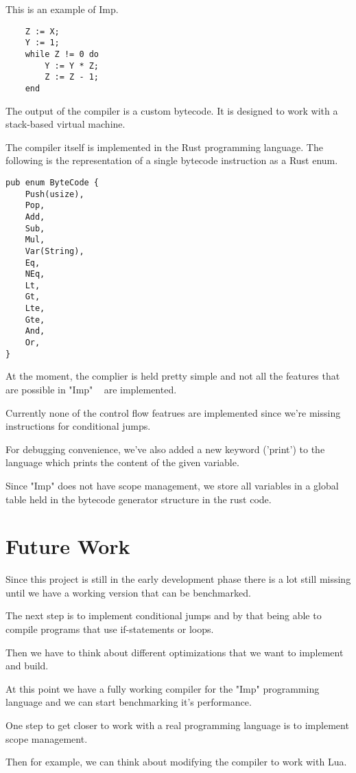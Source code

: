 \documentclass{article}
\begin{document}
This is an example of Imp.
\begin{verbatim}
    Z := X;
    Y := 1;
    while Z != 0 do
        Y := Y * Z;
        Z := Z - 1;
    end
\end{verbatim}

The output of the compiler is a custom bytecode. It is designed to work with a
stack-based virtual machine.

The compiler itself is implemented in the Rust programming language. The
following is the representation of a single bytecode instruction as a Rust
enum.

\begin{verbatim}
pub enum ByteCode {
    Push(usize),
    Pop,
    Add,
    Sub,
    Mul,
    Var(String),
    Eq,
    NEq,
    Lt,
    Gt,
    Lte,
    Gte,
    And,
    Or,
}
\end{verbatim}

At the moment, the complier is held pretty simple and not all the features that
are possible in "Imp" ~\cite{Pierce:SF1} are implemented. 

Currently none of the control flow featrues are implemented since we're missing
instructions for conditional jumps.

For debugging convenience, we've also added a new keyword ('print') to the
language which prints the content of the given variable.

Since "Imp" does not have scope management, we store all variables in a global
table held in the bytecode generator structure in the rust code.

\section{Future Work}
Since this project is still in the early development phase there is a lot still
missing until we have a working version that can be benchmarked.

The next step is to implement conditional jumps and by that being able
to compile programs that use if-statements or loops.

Then we have to think about different optimizations that we want to implement
and build.

At this point we have a fully working compiler for the "Imp" programming language
and we can start benchmarking it's performance.

One step to get closer to work with a real programming language is to
implement scope management.

Then for example, we can think about modifying the compiler to work with Lua.

\clearpage


\end{document}
